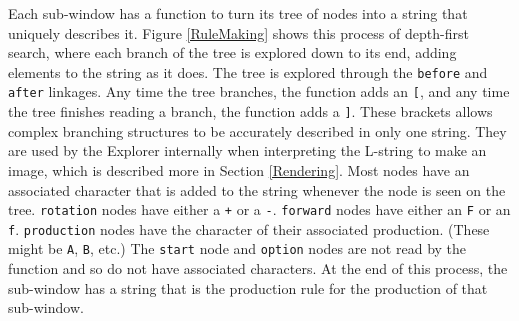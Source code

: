 \documentclass[12pt,twoside]{reedthesis}
\newcommand{\code}[1]{\texttt{#1}}
\begin{document}
	 Each sub-window has a function to turn its tree of nodes into a string that uniquely describes it. Figure \ref{RuleMaking} shows this process of depth-first search, where each branch of the tree is explored down to its end, adding elements to the string as it does. The tree is explored through the \code{before} and \code{after} linkages. Any time the tree branches, the function adds an \code{[}, and any time the tree finishes reading a branch, the function adds a \code{]}. These brackets allows complex branching structures to be accurately described in only one string. They are used by the Explorer internally when interpreting the L-string to make an image, which is described more in Section \ref{Rendering}. Most nodes have an associated character that is added to the string whenever the node is seen on the tree. \code{rotation} nodes have either a \code{+} or a \code{-}. \code{forward} nodes have either an \code{F} or an \code{f}. \code{production} nodes have the character of their associated production. (These might be \code{A}, \code{B}, etc.) The \code{start} node and \code{option} nodes are not read by the function and so do not have associated characters. At the end of this process, the sub-window has a string that is the production rule for the production of that sub-window.
	 
\end{document}
